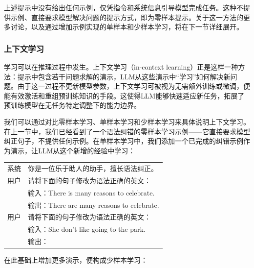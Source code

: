 上述提示中没有给出任何示例，仅凭指令和系统信息引导模型完成任务。这种不提供示例、直接要求模型解决问题的提示方式，即为零样本提示。关于这一方法的更多讨论，以及通过增加示例实现的单样本和少样本学习，将在下一节详细展开。

\subsubsection{上下文学习}

学习可以在推理过程中发生。上下文学习（in-context learning）正是这样一种方法：提示中包含若干问题求解的演示，LLM从这些演示中“学习”如何解决新问题。由于这一过程不更新模型参数，上下文学习可被视为无需额外训练或微调，便能有效激活和重组预训练知识的手段。这使得LLM能够快速适应新任务，拓展了预训练模型在无任务特定调整下的能力边界。

我们可以通过对比零样本学习、单样本学习和少样本学习来具体说明上下文学习。在上一节中，我们已经看到了一个语法纠错的零样本学习示例——它直接要求模型纠正句子，不提供任何示例。在单样本学习中，我们添加一个已完成的纠错示例作为演示，让LLM从这个新增的经验中学习：

\vspace{0.5em}
\begin{tcolorbox}

\begingroup
\renewcommand{\arraystretch}{1.0}
\setlength{\tabcolsep}{6pt}
\begin{tabular}{r l}
{\color{gray} \footnotesize{系统}} & 你是一位乐于助人的助手，擅长语法纠正。 \\ [0.2cm]
{\color{gray} \footnotesize{用户}}  & 请将下面的句子修改为语法正确的英文： \\ [0.1cm]
 & 输入：There is many reasons to celebrate. \\
 & 输出：There are many reasons to celebrate. \\ [0.2cm]
{\color{gray} \footnotesize{用户}}  & 请将下面的句子修改为语法正确的英文： \\ [0.1cm]
 & 输入：She don't like going to the park. \\
 & 输出：\underline{\hspace{2em}}
\end{tabular}
\endgroup

\end{tcolorbox}
\vspace{0.5em}

在此基础上增加更多演示，便构成少样本学习：

